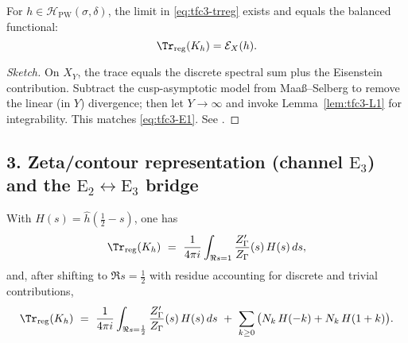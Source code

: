 \begin{proposition}\relax\hspace{0pt}
\label{prop:tfc3-existence} %
For $h\in\mathcal{H}_{\mathrm{PW}}(\sigma,\delta)$, the limit in \eqref{eq:tfc3-trreg} exists and equals the balanced functional:
\[
\Tr_{\mathrm{reg}}(K_h)=\mathcal{E}_X(h).
\]
\end{proposition}

\begin{proof}[Sketch]\relax\hspace{0pt}
On $X_Y$, the trace equals the discrete spectral sum plus the Eisenstein contribution. Subtract the cusp-asymptotic model from Maaß--Selberg to remove the linear (in $Y$) divergence; then let $Y\to\infty$ and invoke Lemma~\ref{lem:tfc3-L1} for integrability. This matches \eqref{eq:tfc3-E1}. See \cite{HejhalII,Borthwick,LaxPhillips}.\relax\hspace{0pt}
\end{proof}

\subsection*{3. Zeta/contour representation (channel \texorpdfstring{$\mathrm{E}_3$}{E3}) and the \texorpdfstring{$\mathrm{E}_2\leftrightarrow \mathrm{E}_3$}{E2↔E3} bridge}\relax\hspace{0pt}
\label{subsec:tfc3-E3} %

\begin{theorem}\relax\hspace{0pt}
\label{thm:tfc3-contour} %
With $H(s)=\widehat{h}(\tfrac12-s)$, one has
\begin{equation}\relax\hspace{0pt}
\label{eq:tfc3-contour}\relax\hspace{0pt}
\Tr_{\mathrm{reg}}(K_h)\ =\ \frac{1}{4\pi i}\int_{\Re s=1}\frac{Z'_\Gamma}{Z_\Gamma}(s)\,H(s)\,ds,
\end{equation}
and, after shifting to $\Re s=\tfrac12$ with residue accounting for discrete and trivial contributions,
\begin{equation}\relax\hspace{0pt}
\label{eq:tfc3-contour-crit}\relax\hspace{0pt}
\Tr_{\mathrm{reg}}(K_h)\ =\ \frac{1}{4\pi i}\int_{\Re s=\frac12}\frac{Z'_\Gamma}{Z_\Gamma}(s)\,H(s)\,ds\ +\ \sum_{k\ge 0}\big(N_k\,H(-k)+N_k\,H(1+k)\big).
\end{equation}
\end{theorem}


